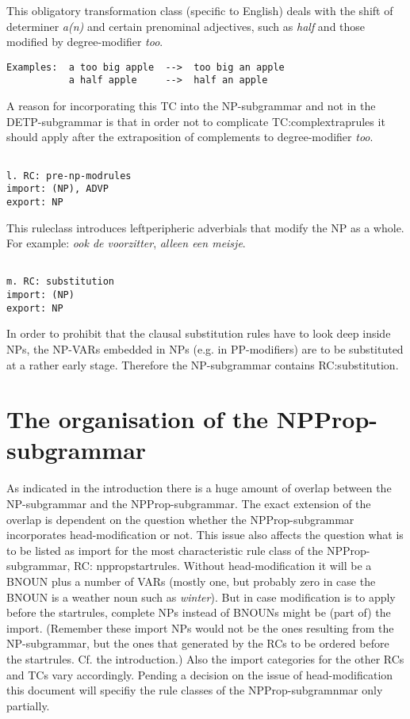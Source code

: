 This obligatory transformation class (specific to English) deals with the shift
of determiner {\em a(n)} and certain prenominal adjectives, such as {\em half}
and those modified by degree-modifier {\em too}. 
\begin{verbatim}
Examples:  a too big apple  -->  too big an apple
           a half apple     -->  half an apple
\end{verbatim}
A reason for incorporating this TC into the NP-subgrammar and not in the
DETP-subgrammar is that in order not to complicate TC:complextraprules it
should apply after the extraposition of complements to degree-modifier {\em
too}. 
\begin{verbatim}

l. RC: pre-np-modrules
import: (NP), ADVP
export: NP
\end{verbatim}
This ruleclass introduces leftperipheric adverbials that modify the NP 
as a whole. For example: {\em ook de voorzitter}, {\em  alleen een meisje}.
\begin{verbatim}

m. RC: substitution
import: (NP)
export: NP
\end{verbatim}
In order to prohibit that the clausal substitution rules have to look 
deep inside NPs, the NP-VARs embedded in NPs (e.g. in PP-modifiers) are to be 
substituted at a rather early stage. Therefore the NP-subgrammar contains 
RC:substitution. 
\section{The organisation of the NPProp-subgrammar}
As indicated in the introduction there is a huge amount of overlap between the
NP-subgrammar and the NPProp-subgrammar. The exact extension of the overlap is
dependent on the question whether the NPProp-subgrammar incorporates
head-modification or not. This issue also affects the question what is to be
listed as import for the most characteristic rule class of the
NPProp-subgrammar, RC: nppropstartrules. Without head-modification it will be a
BNOUN plus a number of VARs (mostly one, but probably zero in case the BNOUN is
a weather noun such as {\em winter}).  But in case modification is to apply
before the startrules, complete NPs instead of BNOUNs might be (part of) the
import. (Remember these import NPs would not be the ones resulting from the
NP-subgrammar, but the ones that generated by the RCs to be ordered before the
startrules. Cf. the introduction.) Also the import categories for the other
RCs and TCs vary accordingly. Pending a decision on the issue of 
head-modification
this
document will specifiy the rule classes of the NPProp-subgramnmar only
partially. 

